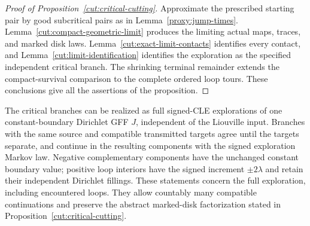 \begin{proof}[Proof of Proposition~\ref{cut:critical-cutting}]
Approximate the prescribed starting pair by good subcritical pairs as in
Lemma~\ref{proxy:jump-times}.  Lemma~\ref{cut:compact-geometric-limit}
produces the limiting actual maps, traces, and marked disk laws.
Lemma~\ref{cut:exact-limit-contacts} identifies every contact, and
Lemma~\ref{cut:limit-identification} identifies the exploration as the
specified independent critical branch.  The shrinking terminal remainder
extends the compact-survival comparison to the complete ordered loop tours.
These conclusions give all the assertions of the proposition.
\end{proof}

\begin{proposition}\label{cut:branching-fields}
The critical branches can be realized as full signed-CLE explorations of
one constant-boundary Dirichlet GFF \(J\), independent of the Liouville input.
Branches with the same source and compatible transmitted targets agree until
the targets separate, and continue in the resulting components with the
signed exploration Markov law.  Negative complementary components have the
unchanged constant boundary value; positive loop interiors have the signed
increment \(\pm2\lambda\) and retain their independent Dirichlet fillings.
These statements concern the full exploration, including encountered loops.
They allow countably many compatible continuations and preserve the abstract
marked-disk factorization stated in Proposition~\ref{cut:critical-cutting}.
\end{proposition}
